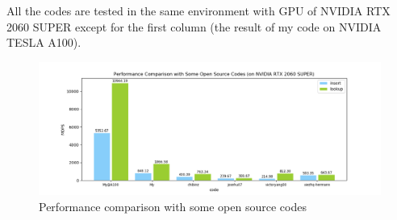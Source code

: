 \documentclass[10pt,twocolumn,letterpaper]{article}
\begin{document}
All the codes are tested in the same environment with GPU of NVIDIA RTX 2060 SUPER except for the first column (the result of my code on NVIDIA TESLA A100). 
\begin{figure}[!h]
    \centering
    \includegraphics[scale=0.5]{figures/cmp.png}
    \caption{Performance comparison with some open source codes}
    \label{fig:comparison}
\end{figure}



\end{document}
